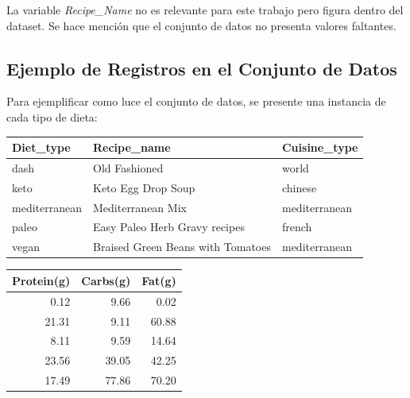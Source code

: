 \documentclass[12pt,a4paper]{article}
\begin{document}
        La variable \emph{Recipe\_Name} no es relevante para este trabajo pero figura 
        dentro del dataset. Se hace mención que el conjunto de datos no presenta 
        valores faltantes.

    \subsection{Ejemplo de Registros en el Conjunto de Datos}

        Para ejemplificar como luce el conjunto de datos, se presente 
        una instancia de cada tipo de dieta:

        \begin{center}

            \begin{tabular}{lll}
                \toprule
                    \textbf{Diet\_type} & \textbf{Recipe\_name} & \textbf{Cuisine\_type} \\
                \midrule
                    dash          & Old Fashioned                     & world \\
                    keto          & Keto Egg Drop Soup                & chinese \\
                    mediterranean & Mediterranean Mix                 & mediterranean \\
                    paleo         & Easy Paleo Herb Gravy recipes     & french \\
                    vegan         & Braised Green Beans with Tomatoes & mediterranean \\
                \bottomrule
            \end{tabular}

        \end{center}

        \begin{center}

            \begin{tabular}{rrr}
                \toprule
                    \textbf{Protein(g)} & \textbf{Carbs(g)} & \textbf{Fat(g)} \\
                \midrule
                     0.12 &  9.66 &  0.02 \\
                    21.31 &  9.11 & 60.88 \\
                     8.11 &  9.59 & 14.64 \\
                    23.56 & 39.05 & 42.25 \\
                    17.49 & 77.86 & 70.20 \\
                \bottomrule
            \end{tabular}

        \end{center}
\end{document}

